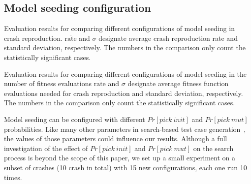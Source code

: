\subsection{Model seeding configuration}

\begin{table}[t]
	\center
	\caption{Evaluation results for comparing different configurations of model seeding in crash reproduction. $\overline{\text{rate}}$ and $\sigma$  designate average crash reproduction rate and standard deviation, respectively. The numbers in the comparison only count the statistically significant cases.}
	\label{tab:additional-expe-repr-table}
    \begin{footnotesize}
	
    \end{footnotesize}
\end{table}

\begin{table*} [t]
	\center
	\caption{Evaluation results for comparing different configurations of model seeding in the number of fitness evaluations $\overline{\text{rate}}$ and $\sigma$  designate average fitness function evaluations needed for crash reproduction and standard deviation, respectively. The numbers in the comparison only count the statistically significant cases.}
	\label{tab:additional-expe-ff-evals-table}
	\begin{footnotesize}
	
	\end{footnotesize}
\end{table*}

Model seeding can be configured with different $Pr[pick\ init]$ and $Pr[pick\ mut]$ probabilities. Like many other parameters in search-based test case generation~\cite{Arcuri2013}, the values of those parameters could influence our results.
Although a full investigation of the effect of $Pr[pick\ init]$ and $Pr[pick\ mut]$ on the search process is beyond the scope of this paper, we set up a small experiment on a subset of crashes (10 crash in total) with 15 new configurations, each one run 10 times.

